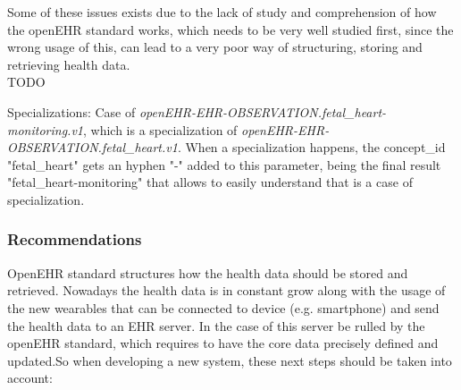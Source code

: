 \documentclass[mim_thesis.tex]{subfiles}
\begin{document}
Some of these issues exists due to the lack of study and comprehension of how the openEHR standard works, which needs to be very well studied first, since the wrong usage of this, can lead to a very poor way of structuring, storing and retrieving health data. \\

TODO

Specializations: Case of \textit{openEHR-EHR-OBSERVATION.fetal\_heart-monitoring.v1}, which is a specialization of \textit{openEHR-EHR-OBSERVATION.fetal\_heart.v1}. When a specialization happens, the concept\_id "fetal\_heart" gets an hyphen "-" added to this parameter, being the final result "fetal\_heart-monitoring" that allows to easily understand that is a case of specialization.

\subsubsection{Recommendations}
OpenEHR standard structures how the health data should be stored and retrieved. Nowadays the health data is in constant grow along with the usage of the new wearables that can be connected to device (e.g. smartphone) and send the health data to an EHR server. In the case of this server be rulled by the openEHR standard, which requires to have the core data precisely defined and updated.So when developing a new system, these next steps should be taken into account:
\end{document}
